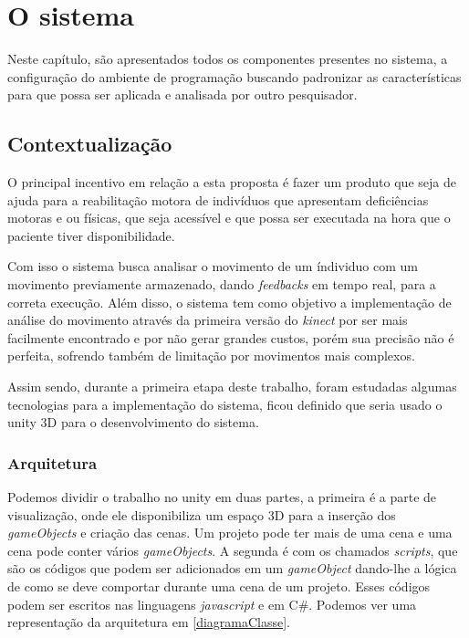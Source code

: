\chapter[O sistema]{O sistema}
Neste capítulo, são apresentados todos os componentes presentes no sistema,
 a configuração do ambiente de programação buscando padronizar as características para que possa ser aplicada e analisada por outro pesquisador.

\section{Contextualização}
  O principal incentivo em relação a esta proposta é fazer um produto que seja de ajuda
para a reabilitação motora  de indivíduos que apresentam deficiências motoras e ou físicas, que seja acessível e
que possa ser executada na hora que o paciente tiver disponibilidade.

  Com isso o sistema busca analisar o movimento de um índividuo com um movimento previamente
armazenado, dando \textit{feedbacks} em tempo real, para a correta execução. Além disso,
o sistema tem como objetivo a implementação de análise do movimento através da primeira
versão do \textit{kinect} por ser mais facilmente encontrado e por não gerar grandes custos, porém
sua precisão não é perfeita, sofrendo também de limitação por movimentos mais complexos.

Assim sendo, durante a primeira etapa deste trabalho,  foram estudadas algumas tecnologias para a implementação do sistema,
 ficou definido que seria usado o unity 3D para o desenvolvimento do sistema.

\subsection{Arquitetura}\label{sub:arquitetura}
  Podemos dividir o trabalho no unity em duas partes,
a primeira é a parte de visualização, onde ele disponibiliza um espaço 3D para a inserção dos \textit{gameObjects} e criação das cenas. Um projeto pode
ter mais de uma cena e uma cena pode conter vários \textit{gameObjects}. A segunda é com os chamados \textit{scripts}, que são os códigos que podem
ser adicionados em um \textit{gameObject} dando-lhe a lógica de como se deve comportar durante uma cena de um projeto. Esses códigos podem ser escritos
nas linguagens \textit{javascript} e em C\#. Podemos ver uma representação da arquitetura em \ref{diagramaClasse}.


